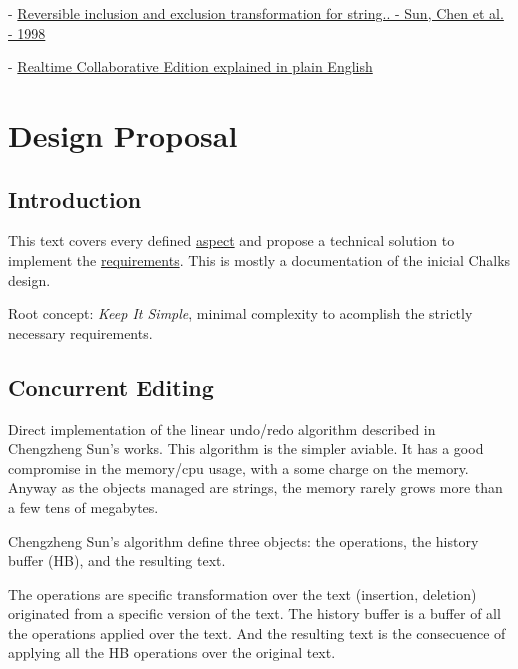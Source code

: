 \documentclass{report}
\begin{document}
- \href{http://citeseer.ist.psu.edu/sun98reversible.html}{Reversible inclusion and exclusion transformation for string.. - Sun, Chen et al. - 1998}

- \href{http://intcomm.wiki.taoriver.net/moin.cgi/RealTimeCooperativeEditingSystemsPaper}{Realtime Collaborative Edition explained in plain English}
\chapter{Design Proposal}

\section{Introduction}

This text covers every defined \href{http://ryalias.freezope.org/Chalks/Aspects}{aspect} and propose a technical solution to implement the \href{http://ryalias.freezope.org/Chalks/ChalksRequirements}{requirements}.
This is mostly a documentation of the inicial Chalks design.


Root concept: \emph{Keep It Simple}, minimal complexity to acomplish the strictly necessary requirements.


\section{Concurrent Editing}

Direct implementation of the linear undo/redo algorithm described in Chengzheng Sun's works. This algorithm is the simpler aviable. It has a good compromise in the memory/cpu usage, with a some charge on the memory. Anyway as the objects managed are strings, the memory rarely grows more than a few tens of megabytes.

Chengzheng Sun's algorithm define three objects: the operations, the history buffer (HB), and the resulting text.

The operations are specific transformation over the text (insertion, deletion) originated from a specific version of the text. The history buffer is a buffer of all the operations applied over the text. And the resulting text is the consecuence of applying all the HB operations over the original text.
\end{document}
